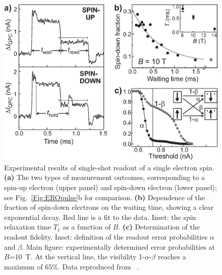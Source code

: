 \documentclass[12pt,aps,nofootinbib]{revtex4-1}
\begin{document}
\begin{figure}[htb]
\includegraphics[width=12cm, clip=true]{hanson_fig16.eps}
\caption{Experimental results of single-shot readout of a single
electron spin. \textbf{(a)} The two types of measurement outcomes,
corresponding to a spin-up electron (upper panel) and spin-down
electron (lower panel); see Fig.~\ref{Fig:EROpulse}b for comparison. \textbf{(b)} Dependence of the fraction of
spin-down electrons on the waiting time, showing a clear
exponential decay. Red line is a fit to the data. Inset: the spin
relaxation time $T_1$ as a function of $B$. \textbf{(c)}
Determination of the readout fidelity. Inset: definition of the readout error probabilities $\alpha$ and $\beta$. Main figure: experimentally determined error probabilities at $B$=10~T. At the vertical line, the visibility 1-$\alpha$-$\beta$ reaches a maximum of
65\%. Data reproduced from ~\textcite{ElzermanNature2004}.} \label{Fig:EROresult}
\end{figure}
\end{document}
